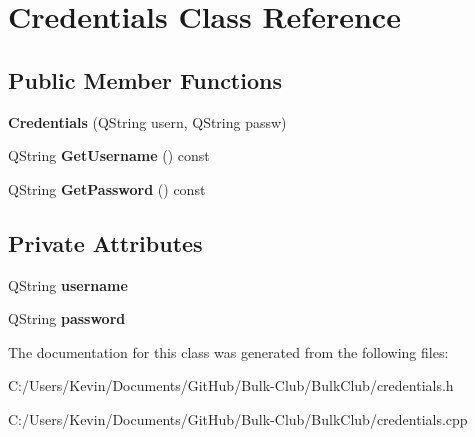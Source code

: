 \hypertarget{class_credentials}{}\section{Credentials Class Reference}
\label{class_credentials}
\subsection*{Public Member Functions}
\begin{DoxyCompactItemize}
\item 
\mbox{\label{class_credentials_a20ef865fe7e0c03ccafc644bfa7e5299}} 
{\bfseries Credentials} (Q\+String usern, Q\+String passw)
\item 
\mbox{\label{class_credentials_aef9c82c68cc3bd74ba9db91a1f21c19d}} 
Q\+String {\bfseries Get\+Username} () const
\item 
\mbox{\label{class_credentials_a5e736c8291c090474d8939f54ab34674}} 
Q\+String {\bfseries Get\+Password} () const
\end{DoxyCompactItemize}
\subsection*{Private Attributes}
\begin{DoxyCompactItemize}
\item 
\mbox{\label{class_credentials_a1e875612ba94a6853ffc948d9aa3ccfc}} 
Q\+String {\bfseries username}
\item 
\mbox{\label{class_credentials_a6d871a6473fb4101d9b60306dd56603e}} 
Q\+String {\bfseries password}
\end{DoxyCompactItemize}


The documentation for this class was generated from the following files\+:\begin{DoxyCompactItemize}
\item 
C\+:/\+Users/\+Kevin/\+Documents/\+Git\+Hub/\+Bulk-\/\+Club/\+Bulk\+Club/credentials.\+h\item 
C\+:/\+Users/\+Kevin/\+Documents/\+Git\+Hub/\+Bulk-\/\+Club/\+Bulk\+Club/credentials.\+cpp\end{DoxyCompactItemize}
